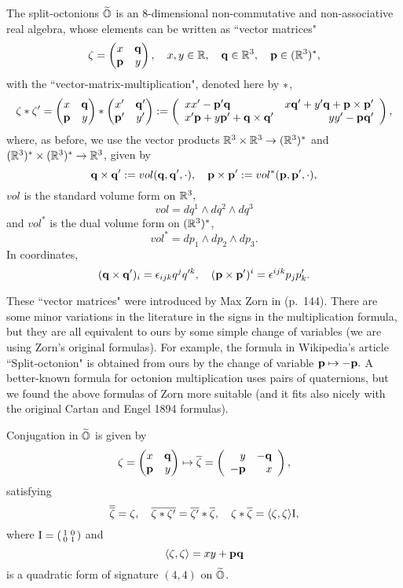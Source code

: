 The split-octonions $\widetilde{\mathbb O}$ is an $8$-dimensional non-commutative and non-associative real algebra, whose elements can be written  as ``vector matrices"
$$\zeta=\left(\begin{matrix}x&\mathbf q \\ {\mathbf p}&y\end{matrix}\right),\quad x,y\in\mathbb{R},\quad \mathbf q\in\mathbb{R}^3, \quad {\mathbf p}\in(\mathbb{R}^3)^*,$$
with the ``vector-matrix-multiplication", denoted here by $\ast$, 
$$\zeta\ast \zeta'=\left(\begin{matrix}x&\mathbf q \\ {\mathbf p}&y\end{matrix}\right)\ast\left(\begin{matrix}x'&\mathbf q' \\ {\mathbf p}'&y'\end{matrix}\right):=
\left(\begin{array}{lr}xx'-{\mathbf p}'\mathbf q& x\mathbf q'+ y'\mathbf q+ {\mathbf p}\times{\mathbf p}'\\ x'{\mathbf p}+ y{\mathbf p}'+ \mathbf q\times\mathbf q'&yy'-{\mathbf p}\mathbf q'\end{array}\right), $$
%
where, as before,  we use the vector products $\mathbb{R}^3\times\mathbb{R}^3\to(\mathbb{R}^3)^*$ and $(\mathbb{R}^3)^*\times(\mathbb{R}^3)^*\to\mathbb{R}^3$, given by
$$\mathbf q\times\mathbf q':=vol(\mathbf q,\mathbf q', \cdot),\quad {\mathbf p}\times{\mathbf p}':=vol^*({\mathbf p},{\mathbf p}', \cdot),$$
$vol$ is the standard  volume form on $\mathbb{R}^3,$
$$vol=dq^1\wedge dq^2\wedge dq^3$$
and $vol^*$ is the dual volume form on $(\mathbb{R}^3)^*$, 
$$vol^*=dp_1\wedge dp_2\wedge dp_3.$$
In coordinates, 
$$(\mathbf q\times\mathbf q')_i=\epsilon_{ijk}q^jq'^k,\quad ({\mathbf p}\times{\mathbf p}')^i=\epsilon^{ijk}p_jp'_k.$$

\begin{rmrk}  These ``vector matrices" were  introduced   by Max Zorn in \cite{Z} (p.~144).   There are some minor variations  in the literature in the signs in the multiplication formula, but they are all equivalent to ours  by some simple change of variables (we are using Zorn's original formulas). For example, the formula in Wikipedia's article ``Split-octonion" is 
obtained from  ours by  the change of variable ${\mathbf p}\mapsto -{\mathbf p}.$
A better-known formula for octonion  multiplication uses pairs of quaternions, but we found the above formulas of Zorn more suitable (and it  fits also nicely with the original Cartan and Engel 1894 formulas). 
\end{rmrk}


Conjugation in $\widetilde{\mathbb O}$ is given by 
$$\zeta=\left(\begin{matrix}x&\mathbf q \\ {\mathbf p}&y\end{matrix}\right)\mapsto \overline{\zeta}=\left(\begin{array}{rr}y&-\mathbf q \\ -{\mathbf p}&x\end{array}\right),$$
satisfying  
$$\overline{\overline{\zeta}}=\zeta, \quad \overline{\zeta\ast\zeta'}=\overline{\zeta'}\ast\overline{\zeta},
\quad \zeta\ast\overline{\zeta}=\langle\zeta,\zeta\rangle\rm I,$$
where $\rm I=\left(\begin{smallmatrix}1&0 \\ 0&1\end{smallmatrix}\right)$ and
$$\langle\zeta,\zeta\rangle= xy+{\mathbf p}\mathbf q$$
is a quadratic form  of signature $(4,4)$ on $\widetilde{\mathbb O}$. 

